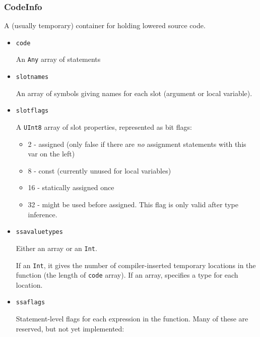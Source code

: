 \hypertarget{15595975163128328315}{}


\subsubsection{CodeInfo}



A (usually temporary) container for holding lowered source code.



\begin{itemize}
\item \texttt{code}

An \texttt{Any} array of statements


\item \texttt{slotnames}

An array of symbols giving names for each slot (argument or local variable).


\item \texttt{slotflags}

A \texttt{UInt8} array of slot properties, represented as bit flags:

\begin{itemize}
\item 2  - assigned (only false if there are \emph{no} assignment statements with this var on the left)


\item 8  - const (currently unused for local variables)


\item 16 - statically assigned once


\item 32 - might be used before assigned. This flag is only valid after type inference.

\end{itemize}

\item \texttt{ssavaluetypes}

Either an array or an \texttt{Int}.

If an \texttt{Int}, it gives the number of compiler-inserted temporary locations in the function (the length of \texttt{code} array). If an array, specifies a type for each location.


\item \texttt{ssaflags}

Statement-level flags for each expression in the function. Many of these are reserved, but not yet implemented:


\end{itemize}
